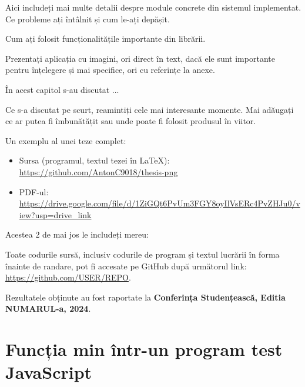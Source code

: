\documentclass[a4paper,12pt]{report}
\renewcommand{\year}{2024}
\newcommand{\conferencesList}{Conferința Studențească, Editia NUMARUL-a, \year}
\newcommand{\github}{\url{https://github.com/USER/REPO}}
\begin{document}
Aici includeți mai multe detalii despre module concrete din sistemul implementat.
Ce probleme ați întâlnit și cum le-ați depășit.

Cum ați folosit funcționalitățile importante din librării.

Prezentați aplicația cu imagini, ori direct în text, 
dacă ele sunt importante pentru înțelegere și mai specifice,
ori cu referințe la anexe.


În acest capitol s-au discutat ...


Ce s-a discutat pe scurt, reamintiți cele mai interesante momente.
Mai adăugați ce ar putea fi îmbunătățit sau unde poate fi folosit produsul în viitor.

Un exemplu al unei teze complet:
\begin{itemize}
  \item Sursa (programul, textul tezei în \LaTeX{}): \url{https://github.com/AntonC9018/thesis-png}
  \item PDF-ul: \url{https://drive.google.com/file/d/1ZiGQt6PvUm3FGY8oyIlVsERc4PvZHJu0/view?usp=drive_link}
\end{itemize}

Acestea 2 de mai jos le includeți mereu:

Toate codurile sursă, inclusiv codurile de program și textul lucrării
în forma înainte de randare, pot fi accesate pe GitHub după următorul link: \github.

Rezultatele obținute au fost raportate la \textbf{\conferencesList}\cite{self}.

\bibliographyChapter

\appendixChapter

\section{Funcția min într-un program test JavaScript}\label{appendix:example_min}
\inputminted{js}{../src/appendix_example.js}

\declarationPage{}
\end{document}
